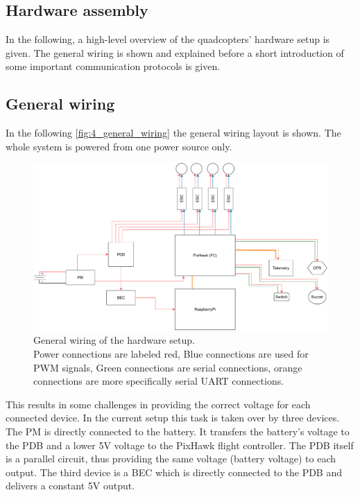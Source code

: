 \subsection{Hardware assembly}\label{subsec:4_hw_setup}
In the following, a high-level overview of the quadcopters' hardware setup is 
given.
The general wiring is shown and explained before a short introduction of some 
important communication protocols is given.

\subsection*{General wiring}
In the following \autoref{fig:4_general_wiring} the general wiring layout is 
shown.
The whole system is powered from one power source only.
\begin{figure}[!h]
    \centering
    \includegraphics[scale=0.5]{general_wiring.pdf}
    \caption[General Wiring]{General wiring of the hardware setup.\\
    Power connections are labeled red, 
    Blue connections are used for \ac{PWM} signals, 
    Green connections are serial connections, 
    orange connections are more specifically serial UART connections.}
    \label{fig:4_general_wiring}
\end{figure}
\FloatBarrier
\noindent This results in some challenges in providing the correct voltage for
each connected device.
In the current setup this task is taken over by three devices.
The \ac{PM} is directly connected to the battery.
It transfers the battery's voltage to the \ac{PDB} and a lower 5V voltage to
the PixHawk flight controller.
The \ac{PDB} itself is a parallel circuit, thus providing the same voltage
(battery voltage) to each output.
The third device is a \ac{BEC} which is directly connected
to the \ac{PDB} and delivers a constant 5V output.

